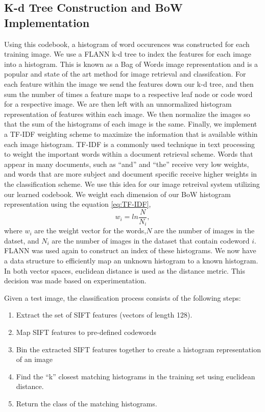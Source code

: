 \subsection{K-d Tree Construction and BoW Implementation}
Using this codebook, a histogram of word occurences was constructed for each training image. 
We use a FLANN k-d tree to index the features for each image into a histogram.
This is known as a Bag of Words image representation and is a popular and state of the art method for image retrieval and classifcation.
For each feature within the image we send the features down our k-d tree, and then sum the number of times a feature maps to a respective leaf node or code word for a respective image.
We are then left with an unnormalized histogram representation of features within each image.
We then normalize the images so that the sum of the histograms of each image is the same.
Finally, we implement a TF-IDF weighting scheme to maximize the information that is available within each image histogram.
TF-IDF is a commonly used technique in text processing to weight the important words within a document retrieval scheme.  
Words that appear in many documents, such as ``and'' and ``the'' receive very low weights, and words that are more subject and document specific receive higher weights in the classification scheme.
We use this idea for our image retreival system utilizing our learned codebook.
We weight each dimension of our BoW histogram representation using the equation \ref{eq:TF-IDF},
\begin{equation}
\label{eq:TF-IDF}
w_{i} = ln\frac{N}{N_{i}},
\end{equation}
where $w_i$ are the weight vector for the words,$N$  are the number of images in the datset, and $N_i$ are the number of images in the dataset that contain codeword $i$.
FLANN was used again to construct an index of these histograms. 
We now have a data structure to efficiently map an unknown histogram to a known histogram.
In both vector spaces, euclidean distance is used as the distance metric. 
This decision was made based on experimentation.

Given a test image, the classification process consists of the following steps:
\begin{enumerate}
\item Extract the set of SIFT features (vectors of length 128).

\item Map SIFT features to pre-defined codewords

\item Bin the extracted SIFT features together to create a histogram representation of an image

\item Find the ``k'' closest matching histograms in the training set using euclidean distance.

\item Return the class of the matching histograms.
\end{enumerate}




